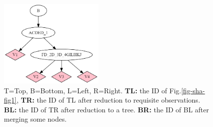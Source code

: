 \begin{itemize}
\begin{figure}[h!]
\includegraphics[width=2in]{influ-diag/sha-fig4coarse.png}
\caption{T=Top, B=Bottom, L=Left, R=Right. {\bf TL:} the ID of Fig.\ref{fig-sha-fig1},
{\bf TR:} the ID of TL after reduction to requisite
observations. {\bf BL:} the ID of TR after reduction to a tree.
{\bf BR:} the ID of BL after merging some nodes.}
\label{fig-sha-fig134}
\end{figure}





\end{itemize}